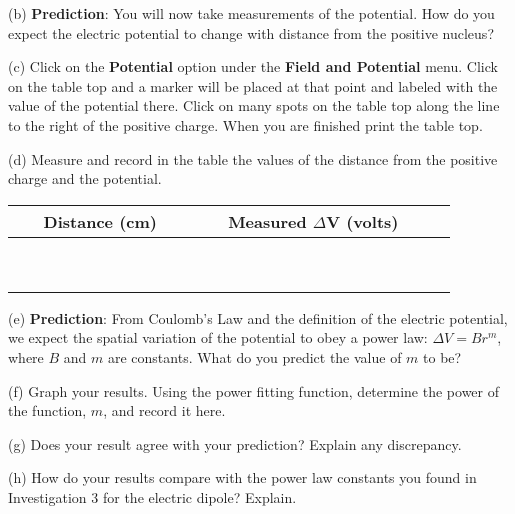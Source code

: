 (b) \textbf{Prediction}: You will now take measurements of the potential.
How do you expect the electric potential to change with distance from the positive nucleus?
\answerspace{15mm}
 
(c) Click on the \textbf{Potential} option under the \textbf{Field and Potential}
menu. Click on the table top and a marker will be
placed at that point and labeled with the value of the potential there.
Click on many spots on the table top along the line to the right of the
positive charge.
When you are finished print the table top.
\answerspace{15mm}

\pagebreak
(d) Measure and record in the table the values of the distance from the
positive charge and the potential.

\vspace{0.3cm}
{\centering \begin{tabular}{|c|c|c|}
\hline 
~~~Distance (cm)~~~&
~~~Measured \( \Delta  \)V (volts)~~~\\
\hline
\hline 
&
\\
\hline 
&
\\
\hline 
&
\\
\hline 
&
\\
\hline 
&
\\
\hline 
&
\\
\hline 
&
\\
\hline 
&
\\
\hline 
&
\\
\hline
\end{tabular}\par}
\vspace{0.3cm}


(e) \textbf{Prediction}: From Coulomb's Law and the definition of the
electric potential, we expect the spatial variation of the potential
to obey a power law: \( \Delta V=Br^{m} \), where \( B \)
and \( m \) are constants. What do you predict the value of \textbf{\( m \)}
to be?\vspace{15mm}


(f) Graph your results. Using the power fitting
function, determine the power of the function, $m$, and record it here.
\vspace{15mm}

(g) Does your result agree with your prediction? Explain any discrepancy.\vspace{15mm}


(h) How do your results compare with the power law constants you found
in Investigation 3 for the electric dipole? Explain.\vspace{15mm}

